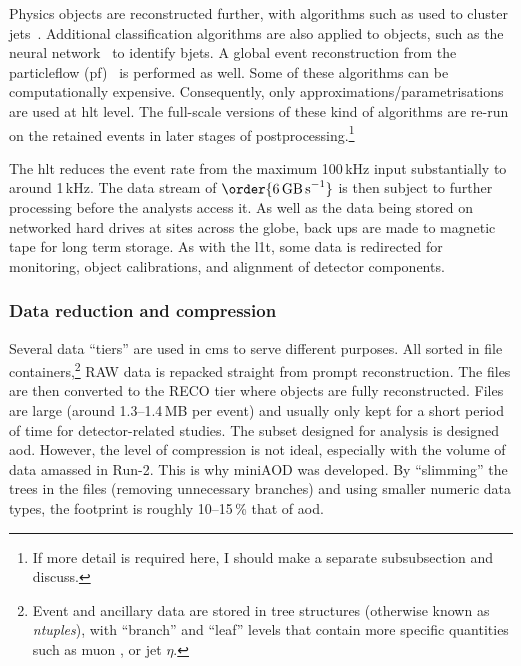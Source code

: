Physics objects are reconstructed further, with algorithms such as  used to cluster \glspl{jet}~\cite{Cacciari:2008gp}. Additional classification algorithms are also applied to objects, such as the \deepcsv neural network~\cite{Sirunyan:2017ezt} to identify \glspl{bjet}. A global event reconstruction from the \gls{particleflow} (\acrshort{pf})~\cite{CMS-PAS-PFT-09-001,CMS-PRF-14-001} is performed as well. Some of these algorithms can be computationally expensive. Consequently, only approximations/parametrisations are used at \acrshort{hlt} level. The full-scale versions of these kind of algorithms are re-run on the retained events in later stages of postprocessing.\footnote{If more detail is required here, I should make a separate subsubsection and discuss.}

The \acrshort{hlt} reduces the event rate from the maximum 100\,kHz input substantially to around 1\,kHz. The data stream of $\order{\text{6\,GB\,s}^{-1}}$ is then subject to further processing before the analysts access it. As well as the data being stored on networked hard drives at sites across the globe, back ups are made to magnetic tape for long term storage. As with the \acrlong{l1t}, some data is redirected for monitoring, object calibrations, and alignment of detector components.





\subsubsection{Data reduction and compression}
\label{subsubsec:cms_data_tiers}

Several data ``tiers'' are used in \acrshort{cms} to serve different purposes. All sorted in \ROOT file containers,\footnote{Event and ancillary data are stored in tree structures (otherwise known as \emph{ntuples}), with ``branch'' and ``leaf'' levels that contain more specific quantities such as muon \pt, or \gls{jet} $\eta$.} RAW data is repacked straight from prompt reconstruction. The files are then converted to the RECO tier where objects are fully reconstructed. Files are large (around 1.3--1.4\,MB per event) and usually only kept for a short period of time for detector-related studies. The subset designed for analysis is designed \acrfull{aod}. However, the level of compression is not ideal, especially with the volume of data amassed in Run-2. This is why miniAOD was developed. By ``slimming'' the trees in the files (removing unnecessary branches) and using smaller numeric data types, the footprint is roughly 10--15\,\% that of \acrshort{aod}.

